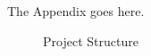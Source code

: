 The Appendix goes here.

\begin{figure}[H]
	\label{figSTRCT}
	\caption{Project Structure}
	\begin{center}
		\setlength\fboxsep{0.3pt}
		\setlength\fboxrule{0.4pt}
	\end{center}
\end{figure}

